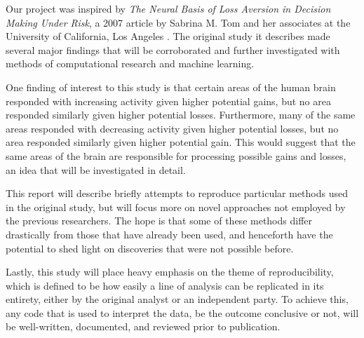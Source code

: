 
\par Our project was inspired by \textit{The Neural Basis of Loss Aversion in 
Decision Making Under Risk}, a 2007 article by Sabrina M. Tom and her associates 
at the University of California, Los Angeles \cite{tom2007neural}. The original 
study it describes made several major findings that will be corroborated and 
further investigated with methods of computational research and machine learning.
\par \indent One finding of interest to this study is that certain areas of the
human brain responded with increasing activity given higher potential gains, but
no area responded similarly given higher potential losses. Furthermore,
many of the same areas responded with decreasing activity given higher potential
losses, but no area responded similarly given higher potential gain. This would
suggest that the same areas of the brain are responsible for processing possible
gains and losses, an idea that will be investigated in detail.
\par \indent This report will describe briefly attempts to reproduce particular
methods used in the original study, but will focus more on novel approaches not
employed by the previous researchers. The hope is that some of these methods
differ drastically from those that have already been used, and henceforth have
the potential to shed light on discoveries that were not possible before.
\par \indent Lastly, this study will place heavy emphasis on the theme of
reproducibility, which is defined to be how easily a line of analysis can be
replicated in its entirety, either by the original analyst or an independent
party. To achieve this, any code that is used to interpret the data, be the
outcome conclusive or not, will be well-written, documented, and reviewed prior
to publication.